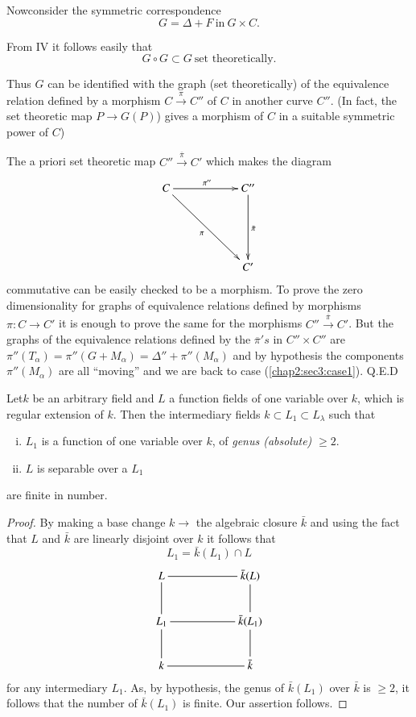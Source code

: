 Now\pageoriginale consider the symmetric correspondence
$$
G= \Delta + F ~\text{in}~ G \times C.
$$

From IV it follows easily that 
$$
G \circ G  \subset G ~\text{set theoretically.}
$$

Thus $G$ can be identified with the graph (set theoretically) of the
equivalence relation defined by a morphism $C \xrightarrow{\pi} C''$ of
$C$ in another curve $C''$. (In fact, the set theoretic map $P
\rightarrow G(P)$) gives a morphism of $C$ in a suitable symmetric
power of $C$) 

The a priori set theoretic map $C''\xrightarrow{\overline{\pi}}C'$ which
makes the diagram 
\[
\xymatrix@R=2cm@C=2cm{C\ar[r]^{\pi''}\ar[dr]_{\pi} & C'' \ar[d]^{\bar{\pi}}\\
&  C'
}
\]
commutative can be easily checked to be a morphism. To prove the zero
dimensionality for graphs of equivalence relations defined by
morphisms $\pi : C \rightarrow C'$ it is enough to prove the same for
the morphisms $C'' \xrightarrow{\overline{\pi}} C'$. But the graphs of
the equivalence relations defined by the $\overline{\pi}'s$  in
$C''\times C''$ are $\pi'' (T_{\alpha })=\pi'' (G + M_{\alpha })= \Delta'' +
\pi'' (M_{\alpha })$  and by hypothesis the components
$\pi''(M_{\alpha })$ are all ``moving'' and we are back to case
(\ref{chap2:sec3:case1}). 
\hfill Q.E.D

\setcounter{corollary}{0}
\begin{corollary}\label{chap2:sec4:coro1}
  Let\pageoriginale $k$ be an arbitrary field and $L$ a function fields of one
  variable over $k$, which is regular extension of $k$. Then the
  intermediary fields $k \subset L_1 \subset L_{\lambda}$ such that  
\end{corollary}

\begin{enumerate}[(i)]
\item $L_1$ is a function of one variable over $k$, of\textit{ genus
  (absolute)} $\ge 2$. 
\item $L$ is separable over a $L_1$
\end{enumerate}
are finite in number.

\begin{proof}%
  By making a base change $k \rightarrow$ the algebraic closure
  $\bar{k}$ and using the fact that $L$ and $\bar{k}$ are linearly
  disjoint over $k$ it follows that  
  $$
  L_1= \bar{k}(L_1) \cap L
  $$
  \[
  \xymatrix@C=2cm{L\ar@{-}[r]\ar@{-}[d]& \bar{k}(L) \ar@{-}[d] \\
    L_1\ar@{-}[d] \ar@{-}[r]& \bar{k}(L_1) \ar@{-}[d]\\
    k \ar@{-}[r]& \bar{k}
  }
  \]
  for any intermediary $L_1$. As, by hypothesis, the genus of
  $\bar{k}(L_1)$ over $\bar{k}$ is $\ge  2$, it follows that the number
  of $\bar{k}(L_1)$ is finite. Our assertion follows. 
\end{proof}

